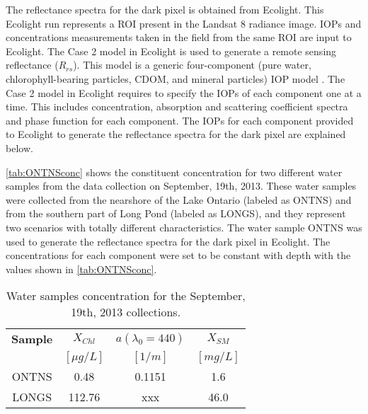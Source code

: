 The reflectance spectra for the dark pixel is obtained from { Ecolight}. This Ecolight run represents a ROI present in the Landsat 8 radiance image. IOPs and concentrations measurements taken in the field from the same ROI are input to Ecolight. The Case 2 model in Ecolight is used to generate a remote sensing reflectance ($R_{rs}$). This model is a generic four-component (pure water, chlorophyll-bearing particles, CDOM, and mineral particles) IOP model \cite{MobleyHEtech}. The Case 2 model in Ecolight requires to specify the IOPs of each component one at a time. This includes concentration, absorption and scattering coefficient spectra and phase function for each component. The IOPs for each component provided to Ecolight to generate the reflectance spectra for the dark pixel are explained below.

\autoref{tab:ONTNSconc} shows the constituent concentration for two different water samples from the data collection on September, 19th, 2013. These water samples were collected from the nearshore of the Lake Ontario (labeled as ONTNS) and from the southern part of Long Pond (labeled as LONGS), and they represent two scenarios with totally different characteristics. The water sample ONTNS was used to generate the reflectance spectra for the dark pixel in Ecolight. The concentrations for each component were set to be constant with depth with the values shown in \autoref{tab:ONTNSconc}. 
\vspace{.5cm}
\begin{table}[!ht]
\caption{ Water samples concentration for the September, 19th, 2013 collections. \label{tab:ONTNSconc} } 
\centering
\begin{tabular}{c|c|c|c} 
 \bfseries{Sample} & \bfseries{$X_{Chl}$} & \bfseries{$a(\lambda_0=440)$}& \bfseries{$X_{SM}$}\\
 & $[\mu g/L]$ & $[1/m]$ & $[mg/L]$ \\ \hline \hline
ONTNS & 0.48 & 0.1151 & 1.6\\ 
LONGS & 112.76 & xxx & 46.0\\ 
 \end{tabular}
\end{table}

